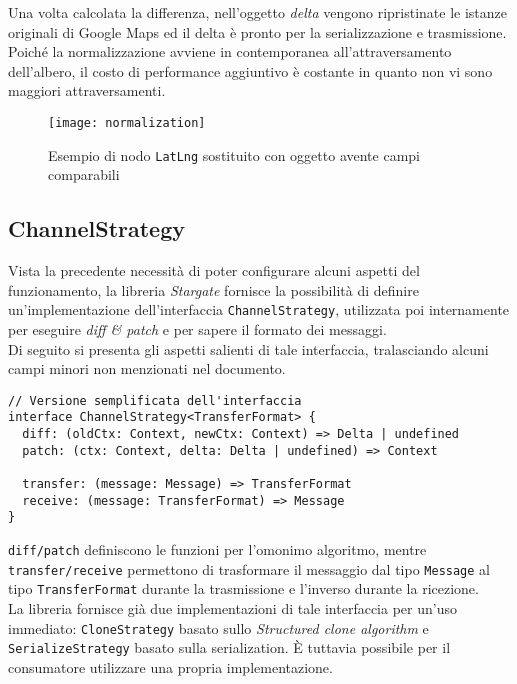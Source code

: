 Una volta calcolata la differenza, nell'oggetto \textit{delta} vengono ripristinate le istanze originali di Google Maps ed il delta è pronto per la serializzazione e trasmissione. \\

Poiché la normalizzazione avviene in contemporanea all'attraversamento dell'albero, il costo di performance aggiuntivo è costante in quanto non vi sono maggiori attraversamenti.

\begin{figure}[H] 
  \centering 
  \texttt{[image: normalization]} 
  \caption{Esempio di nodo \texttt{LatLng} sostituito con oggetto avente campi comparabili}
\end{figure}

\subsection{ChannelStrategy}

Vista la precedente necessità di poter configurare alcuni aspetti del funzionamento, la libreria \textit{Stargate} fornisce la possibilità di definire un'implementazione dell'interfaccia \texttt{ChannelStrategy}, utilizzata poi internamente per eseguire \textit{diff \& patch} e per sapere il formato dei messaggi. \\

Di seguito si presenta gli aspetti salienti di tale interfaccia, tralasciando alcuni campi minori non menzionati nel documento. \\

\begin{lstlisting}[language={[Sharp]C},basicstyle=\footnotesize]
// Versione semplificata dell'interfaccia
interface ChannelStrategy<TransferFormat> {
  diff: (oldCtx: Context, newCtx: Context) => Delta | undefined
  patch: (ctx: Context, delta: Delta | undefined) => Context

  transfer: (message: Message) => TransferFormat
  receive: (message: TransferFormat) => Message
}
\end{lstlisting}

\texttt{diff/patch} definiscono le funzioni per l'omonimo algoritmo, mentre \texttt{transfer/receive} permettono di trasformare il messaggio dal tipo \texttt{Message} al tipo \texttt{TransferFormat} durante la trasmissione e l'inverso durante la ricezione. \\

La libreria fornisce già due implementazioni di tale interfaccia per un'uso immediato: \texttt{CloneStrategy} basato sullo \textit{Structured clone algorithm} e \texttt{SerializeStrategy} basato sulla serialization. È tuttavia possibile per il consumatore utilizzare una propria implementazione. \\

